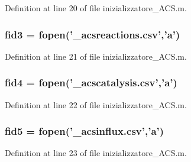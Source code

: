 Definition at line 20 of file inizializzatore\-\_\-\-A\-C\-S.\-m.

\hypertarget{a00068_a153e3250d4161f9bea4c140498016d94}{
\subsubsection[{fid3}]{\setlength{\rightskip}{0pt plus 5cm}fid3 = fopen('\-\_\-acsreactions.\-csv','{\bf a}')}}\label{a00068_a153e3250d4161f9bea4c140498016d94}


Definition at line 21 of file inizializzatore\-\_\-\-A\-C\-S.\-m.

\hypertarget{a00068_a28f0b3b80ef3c84a4a00660a307d2147}{
\subsubsection[{fid4}]{\setlength{\rightskip}{0pt plus 5cm}fid4 = fopen('\-\_\-acscatalysis.\-csv','{\bf a}')}}\label{a00068_a28f0b3b80ef3c84a4a00660a307d2147}


Definition at line 22 of file inizializzatore\-\_\-\-A\-C\-S.\-m.

\hypertarget{a00068_af5f7ad66ed343bca8289a4d44dbff04f}{
\subsubsection[{fid5}]{\setlength{\rightskip}{0pt plus 5cm}fid5 = fopen('\-\_\-acsinflux.\-csv','{\bf a}')}}\label{a00068_af5f7ad66ed343bca8289a4d44dbff04f}


Definition at line 23 of file inizializzatore\-\_\-\-A\-C\-S.\-m.


